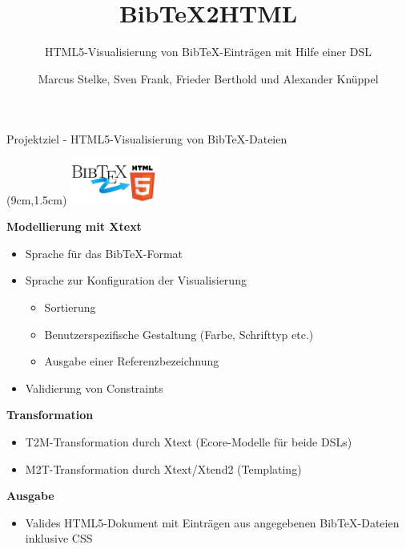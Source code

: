 \documentclass[fleqn,11pt,aspectratio=43]{beamer}
\title{BibTeX2HTML}
\subtitle{HTML5-Visualisierung von BibTeX-Einträgen mit Hilfe einer DSL}
\author{Marcus Stelke, Sven Frank, Frieder Berthold und Alexander Knüppel}
\begin{document}
\begin{frame}[plain]
\titlepage
\end{frame}


{
\begin{frame}{Projektziel - HTML5-Visualisierung von BibTeX-Dateien\strut}
\begin{textblock*}{3cm}(9cm,1.5cm) %
\includegraphics[width=3cm]{../logo.png}
\end{textblock*}
\textbf{Modellierung mit Xtext}
\begin{itemize}
\item Sprache für das BibTeX-Format
\item Sprache zur Konfiguration der Visualisierung 
\begin{itemize}
\item Sortierung
\item Benutzerspezifische Gestaltung (Farbe, Schrifttyp etc.)
\item Ausgabe einer Referenzbezeichnung
\end{itemize}
\item Validierung von Constraints
\end{itemize}

\textbf{Transformation }
\begin{itemize}
\item T2M-Transformation durch Xtext (Ecore-Modelle für beide DSLs)
\item M2T-Transformation durch Xtext/Xtend2 (Templating)
\end{itemize}

\textbf{Ausgabe}
\begin{itemize}
\item Valides HTML5-Dokument mit Einträgen aus angegebenen BibTeX-Dateien inklusive CSS
\end{itemize} 
\end{frame}
}
\end{document}
